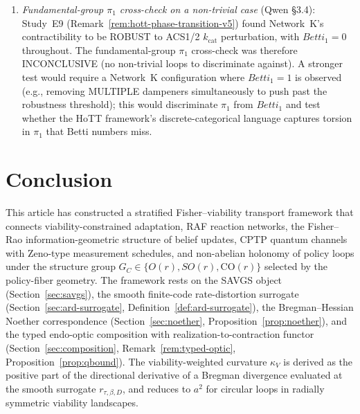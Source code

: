 \documentclass[11pt,a4paper]{article}
\theoremstyle{plain}
\theoremstyle{definition}
\theoremstyle{remark}
\newcommand{\kk}{\kappa_{\!V}}
\newcommand{\CO}{\mathrm{CO}}
\begin{document}
\begin{enumerate}[leftmargin=*,itemsep=2pt]
  (Remark~\ref{rem:e11-cross-organism}). The closure test is now
  applied to THREE FIXED real BiGG models spanning TWO domains of
  life: iJO1366 (E.~coli K-12 MG1655), iAF1260 (E.~coli K-12 alt
  reconstruction, Feist 2010), iMM904 (S.~cerevisiae, Mo 2009).
  Network B ortholog verdict agreement: $9/10$ (iJO1366 vs iAF1260,
  same organism), $7/10$ (iJO1366 vs iMM904, cross-organism).
  Universal ``metabolic robust + enzyme fragile'' signature
  confirmed in ALL THREE organisms ($+10.7$pp / $+39.3$pp /
  $+29.8$pp for $n_{\mathrm{prod}} \geq 2$ vs $= 1$).
\item \emph{Fundamental-group $\pi_1$ cross-check on a non-trivial
case} (Qwen \S 3.4): Study~E9
(Remark~\ref{rem:hott-phase-transition-v5}) found Network~K's
contractibility to be ROBUST to ACS1/2 $k_{\mathrm{cat}}$
perturbation, with $Betti_1 = 0$ throughout. The fundamental-group
$\pi_1$ cross-check was therefore INCONCLUSIVE (no non-trivial loops
to discriminate against). A stronger test would require a
Network~K configuration where $Betti_1 = 1$ is observed (e.g.,
removing MULTIPLE dampeners simultaneously to push past the
robustness threshold); this would discriminate $\pi_1$ from $Betti_1$
and test whether the HoTT framework's discrete-categorical language
captures torsion in $\pi_1$ that Betti numbers miss.
\end{enumerate}

\section{Conclusion}\label{sec:conclusion}

This article has constructed a stratified Fisher--viability transport
framework that connects viability-constrained adaptation, RAF reaction
networks, the Fisher--Rao information-geometric structure of belief
updates, CPTP quantum channels with Zeno-type measurement schedules,
and non-abelian holonomy of policy loops under the structure group
$G_C \in \{O(r), SO(r), \CO(r)\}$ selected by the policy-fiber
geometry. The framework rests on the SAVGS object
(Section~\ref{sec:savgs}), the smooth finite-code rate-distortion
surrogate (Section~\ref{sec:ard-surrogate},
Definition~\ref{def:ard-surrogate}), the Bregman--Hessian Noether
correspondence (Section~\ref{sec:noether},
Proposition~\ref{prop:noether}), and the typed endo-optic composition
with realization-to-contraction functor
(Section~\ref{sec:composition}, Remark~\ref{rem:typed-optic},
Proposition~\ref{prop:qbound}). The viability-weighted curvature
$\kk$ is derived as the positive part of the directional derivative of
a Bregman divergence evaluated at the smooth surrogate
$r_{\tau, \beta, D}$, and reduces to $a^2$ for circular loops in
radially symmetric viability landscapes.
\end{document}
